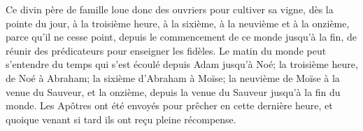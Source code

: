 Ce divin père de famille loue donc des ouvriers pour cultiver sa vigne,
	dès la pointe du jour, à la troisième heure,
	à la sixième, à la neuvième et à la onzième,
	parce qu’il ne cesse point,
		depuis le commencement de ce monde jusqu’à la fin,
	de réunir des prédicateurs pour enseigner les fidèles.
Le matin du monde peut s’entendre
	du temps qui s’est écoulé depuis Adam jusqu’à Noé;
	la troisième heure, de Noé à Abraham;
	la sixième d’Abraham à Moïse;
	la neuvième de Moïse à la venue du Sauveur,
	et la onzième, depuis la venue du Sauveur jusqu’à la fin du monde.
Les Apôtres ont été envoyés pour prêcher en cette dernière heure,
	et quoique venant si tard ils ont reçu pleine récompense.
